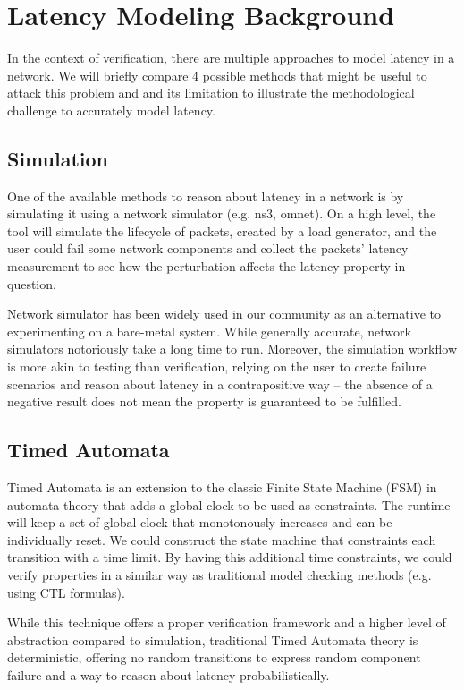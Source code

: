 \section{Latency Modeling Background}
In the context of verification, there are multiple approaches to model latency in a network.
We will briefly compare 4 possible methods that might be useful to attack this problem and 
and its limitation to illustrate the methodological challenge to accurately model latency.

\subsection{Simulation}
One of the available methods to reason about latency in a network is by simulating it 
using a network simulator (e.g. ns3, omnet).
On a high level, the tool will simulate the lifecycle of packets, created by a load generator, 
and the user could fail some network components and collect the packets' latency measurement 
to see how the perturbation affects the latency property in question.

Network simulator has been widely used in our community as an alternative to experimenting on 
a bare-metal system. 
While generally accurate, network simulators notoriously take a long time to run.
Moreover, the simulation workflow is more akin to testing than verification, relying on 
the user to create failure scenarios and reason about latency in a contrapositive way -- 
the absence of a negative result does not mean the property is guaranteed to be fulfilled.

\subsection{Timed Automata}
Timed Automata is an extension to the classic Finite State Machine (FSM) in automata theory that 
adds a global clock to be used as constraints. 
The runtime will keep a set of global clock that monotonously increases and can be individually 
reset.
We could construct the state machine that constraints each transition with a time limit. 
By having this additional time constraints, we could verify properties in a similar way 
as traditional model checking methods (e.g. using CTL formulas).

While this technique offers a proper verification framework and a higher level of abstraction 
compared to simulation, traditional Timed Automata theory is deterministic, offering no random 
transitions to express random component failure and a way to reason about latency probabilistically.

